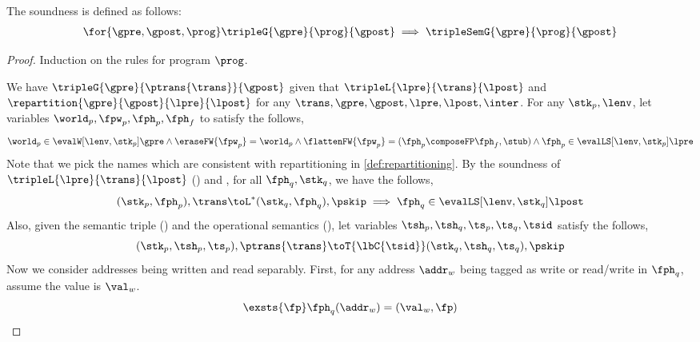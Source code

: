 \begin{thm}[Soundness]
The soundness is defined as follows:
\[
    \begin{array}{@{}l@{}}
        \for{\gpre, \gpost, \prog } \tripleG{\gpre}{\prog}{\gpost} \implies \tripleSemG{\gpre}{\prog}{\gpost}
    \end{array}
\]
\end{thm}
\begin{proof}
Induction on the rules for program \( \prog \).

We have \( \tripleG{\gpre}{\ptrans{\trans}}{\gpost} \) given that \( \tripleL{\lpre}{\trans}{\lpost} \) and \( \repartition{\gpre}{\gpost}{\lpre}{\lpost} \) for any \( \trans, \gpre, \gpost, \lpre, \lpost, \inter \). 
For any \( \stk_{p}, \lenv \), let variables \( \world_{p}, \fpw_{p}, \fph_{p}, \fph_{f} \) to satisfy the follows,
\begin{equation}
    \label{equ:def-wwhh}
    \world_{p} \in \evalW[\lenv, \stk_{p}]{\gpre} 
    \land \eraseFW{\fpw_{p}} = \world_{p}
    \land \flattenFW{\fpw_{p}} = (\fph_{p} \composeFP \fph_{f}, \stub)
    \land \fph_{p} \in \evalLS[\lenv, \stk_{p}]{\lpre}
\end{equation}
Note that we pick the names which are consistent with repartitioning in  \ref{def:repartitioning}.
By the soundness of \( \tripleL{\lpre}{\trans}{\lpost} \) () and , for all \( \fph_{q}, \stk_{q} \), we have the follows,
\begin{equation}
    \label{equ:transaction-soundness}
    (\stk_{p}, \fph_{p} ), \trans \toL^{*}  (\stk_{q}, \fph_{q} ), \pskip 
    \implies \fph_{q} \in \evalLS[\lenv, \stk_{q}]{\lpost}
\end{equation}
Also, given the semantic triple () and the operational semantics (), let variables \( \tsh_{p}, \tsh_{q}, \ts_{p}, \ts_{q}, \tsid \) satisfy the follows,
\begin{equation}
    \label{equ:commit-current-trans}
    (\stk_{p}, \tsh_{p}, \ts_{p}), \ptrans{\trans} \toT{\lbC{\tsid}} (\stk_{q}, \tsh_{q}, \ts_{q}), \pskip 
\end{equation}
Now we consider addresses being written and read separably.
First, for any address \( \addr_{w} \) being tagged as write or read/write in \( \fph_{q} \), assume the value is \( \val_{w} \).
\begin{equation}
    \label{equ:local-write}
    \exsts{\fp} 
    \fph_{q}(\addr_{w}) = (\val_{w}, \fp)

\end{equation}
\end{proof}
